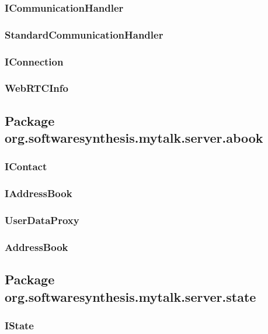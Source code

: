 \subsubsection{ICommunicationHandler}

\subsubsection{StandardCommunicationHandler}

\subsubsection{IConnection}

\subsubsection{WebRTCInfo}

\subsection{Package org.softwaresynthesis.mytalk.server.abook}

\subsubsection{IContact}

\subsubsection{IAddressBook}

\subsubsection{UserDataProxy}

\subsubsection{AddressBook}

\subsection{Package org.softwaresynthesis.mytalk.server.state}

\subsubsection{IState}

